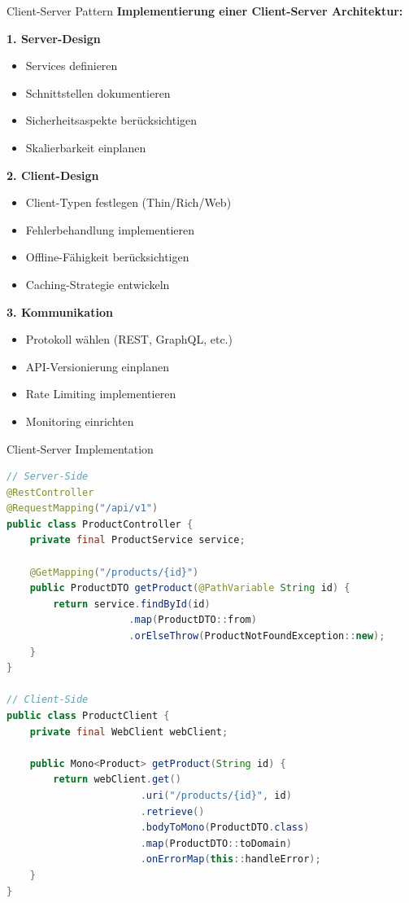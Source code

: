 \begin{KR}{Client-Server Pattern}
\textbf{Implementierung einer Client-Server Architektur:}

\textbf{1. Server-Design}
\begin{itemize}
    \item Services definieren
    \item Schnittstellen dokumentieren
    \item Sicherheitsaspekte berücksichtigen
    \item Skalierbarkeit einplanen
\end{itemize}

\textbf{2. Client-Design}
\begin{itemize}
    \item Client-Typen festlegen (Thin/Rich/Web)
    \item Fehlerbehandlung implementieren
    \item Offline-Fähigkeit berücksichtigen
    \item Caching-Strategie entwickeln
\end{itemize}

\textbf{3. Kommunikation}
\begin{itemize}
    \item Protokoll wählen (REST, GraphQL, etc.)
    \item API-Versionierung einplanen
    \item Rate Limiting implementieren
    \item Monitoring einrichten
\end{itemize}
\end{KR}

\begin{example2}{Client-Server Implementation}
\begin{lstlisting}[language=Java, style=basesmol]
// Server-Side
@RestController
@RequestMapping("/api/v1")
public class ProductController {
    private final ProductService service;
    
    @GetMapping("/products/{id}")
    public ProductDTO getProduct(@PathVariable String id) {
        return service.findById(id)
                     .map(ProductDTO::from)
                     .orElseThrow(ProductNotFoundException::new);
    }
}

// Client-Side
public class ProductClient {
    private final WebClient webClient;
    
    public Mono<Product> getProduct(String id) {
        return webClient.get()
                       .uri("/products/{id}", id)
                       .retrieve()
                       .bodyToMono(ProductDTO.class)
                       .map(ProductDTO::toDomain)
                       .onErrorMap(this::handleError);
    }
}
\end{lstlisting}
\end{example2}


